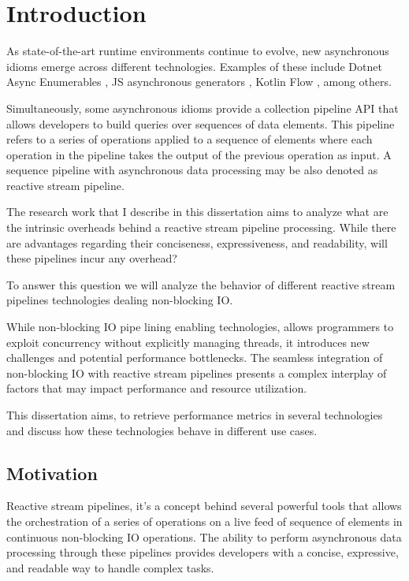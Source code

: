 % 
%  
%
\chapter{Introduction}
\label{cha:introduction}


As state-of-the-art runtime environments continue to evolve, new asynchronous idioms emerge across different technologies. Examples of these include Dotnet Async Enumerables \cite{DOTNET_ASYNC_ENUM}, JS asynchronous generators \cite{JS_ASYNC_GENERATOR}, Kotlin Flow \cite{KOTLIN_FLOW}, among others.

Simultaneously, some asynchronous idioms provide a collection pipeline API \cite{FOWLER} that allows developers to build queries over sequences of data elements. This pipeline refers to a series of operations applied to a sequence of elements where each operation in the pipeline takes the output of the previous operation as input. A sequence pipeline with asynchronous data processing may be also denoted as reactive stream pipeline.

The research work that I describe in this dissertation aims to analyze what are the intrinsic overheads behind a reactive stream pipeline processing. While there are advantages regarding their conciseness, expressiveness, and readability, will these pipelines incur any overhead?

To answer this question we will analyze the behavior of different reactive stream pipelines technologies dealing non-blocking IO.

While non-blocking IO pipe lining enabling technologies, allows programmers to exploit concurrency without explicitly managing threads, it introduces new challenges and potential performance bottlenecks. The seamless integration of non-blocking IO with reactive stream pipelines presents a complex interplay of factors that may impact performance and resource utilization. 

This dissertation aims, to retrieve performance metrics in several technologies and discuss how these technologies behave in different use cases.

\section{Motivation}
\label{sec:motivation}

Reactive stream pipelines, it's a  concept behind several powerful tools that allows the orchestration of a series of operations on a live feed of sequence of elements in continuous non-blocking IO operations. The ability to perform asynchronous data processing through these pipelines provides developers with a concise, expressive, and readable way to handle complex tasks.

